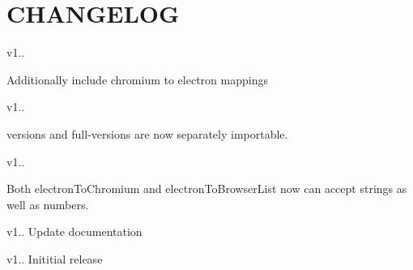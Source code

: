 \chapter{CHANGELOG}
\hypertarget{md_pkiclassroomrescheduler_2src_2main_2frontend_2node__modules_2electron-to-chromium_2_c_h_a_n_g_e_l_o_g}{}\label{md_pkiclassroomrescheduler_2src_2main_2frontend_2node__modules_2electron-to-chromium_2_c_h_a_n_g_e_l_o_g}
v1..
\begin{DoxyItemize}
\item Additionally include chromium to electron mappings
\end{DoxyItemize}

v1..
\begin{DoxyItemize}
\item versions and full-\/versions are now separately importable.
\end{DoxyItemize}

v1..
\begin{DoxyItemize}
\item Both electron\+To\+Chromium and electron\+To\+Browser\+List now can accept strings as well as numbers.
\end{DoxyItemize}

v1.. Update documentation

v1.. Inititial release 